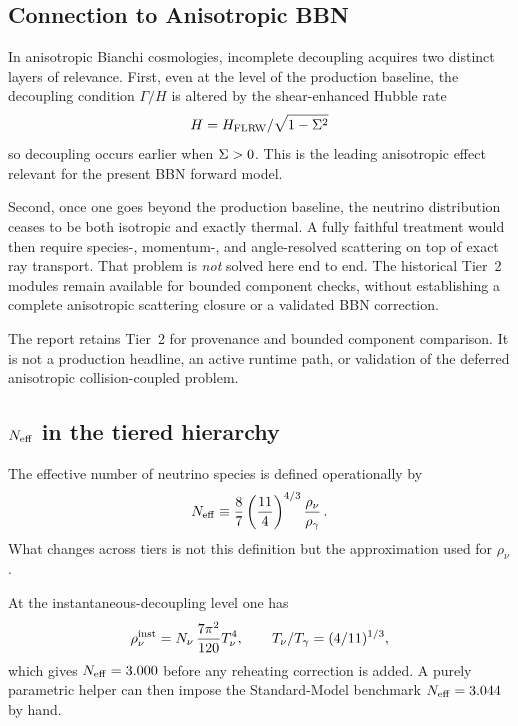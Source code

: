 \subsection{Connection to Anisotropic BBN}

In anisotropic Bianchi cosmologies, incomplete decoupling acquires two distinct layers of relevance.  First, even at the level of the production baseline, the decoupling condition $\Gamma/H$ is altered by the shear-enhanced Hubble rate
\begin{equation}
H=H_{\rm FLRW}/\sqrt{1-\Sigma^2}
\end{equation}
so decoupling occurs earlier when $\Sigma>0$.  This is the leading anisotropic effect relevant for the present BBN forward model.

Second, once one goes beyond the production baseline, the neutrino distribution ceases to be both isotropic and exactly thermal.  A fully faithful treatment would then require species-, momentum-, and angle-resolved scattering on top of exact ray transport.  That problem is \emph{not} solved here end to end.  The historical Tier~2 modules remain available for bounded component checks, without establishing a complete anisotropic scattering closure or a validated BBN correction.

The report retains Tier~2 for provenance and bounded component comparison.  It is not a production headline, an active runtime path, or validation of the deferred anisotropic collision-coupled problem.

\subsection{\texorpdfstring{$N_{\rm eff}$}{Neff} in the tiered hierarchy}

The effective number of neutrino species is defined operationally by
\begin{equation}
N_{\rm eff} \equiv \frac{8}{7}\left(\frac{11}{4}\right)^{4/3}\frac{\rho_\nu}{\rho_\gamma}\,.
\end{equation}
What changes across tiers is not this definition but the approximation used for $\rho_\nu$.

At the instantaneous-decoupling level one has
\begin{equation}
\rho_\nu^{\rm inst} = N_\nu\,\frac{7\pi^2}{120}T_\nu^4,
\qquad T_\nu/T_\gamma=(4/11)^{1/3},
\end{equation}
which gives $N_{\rm eff}=3.000$ before any reheating correction is added.  A purely parametric helper can then impose the Standard-Model benchmark $N_{\rm eff}=3.044$ by hand.

